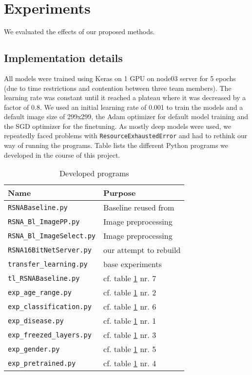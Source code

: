 \documentclass[10pt,twocolumn,letterpaper]{article}
\begin{document}
\section{Experiments}
We evaluated the effects of our proposed methods.

\subsection{Implementation details}
All models were trained using Keras \cite{keras} on 1
GPU on node03 server for 5 epochs (due to time restrictions and contention between three team members). The learning rate was constant until it reached a plateau where it was decreased by a factor of 0.8. We used an initial learning rate of 0.001 to train the models and a default image size of 299x299, the Adam optimizer for default model training and the SGD optimizer for the finetuning. As mostly deep models were used, we repeatedly faced problems with \verb+ResourceExhaustedError+ and had to rethink our way of running the programs. Table lists the different Python programs we developed in the course of this project.

\begin{table}[h]
\begin{center}
\begin{tabular}{|l|l|}
\hline
Name & Purpose \\
\hline\hline
\verb+RSNABaseline.py+ & Baseline reused from \cite{kaggleboneage}  \\
\verb+RSNA_Bl_ImagePP.py+ & Image preprocessing \\
\verb+RSNA_Bl_ImageSelect.py+ & Image preprocessing \\
\verb+RSNA16BitNetServer.py+ & our attempt to rebuild \cite{16bitrsnachallenge} \\
\verb+transfer_learning.py+ & base experiments \\
\verb+tl_RSNABaseline.py+ & cf. table \ref{table:taexp} nr. 7  \\
\verb+exp_age_range.py+ & cf. table \ref{table:taexp} nr. 2 \\
\verb+exp_classification.py+ & cf. table \ref{table:taexp} nr. 6 \\
\verb+exp_disease.py+ & cf. table \ref{table:taexp} nr. 1 \\
\verb+exp_freezed_layers.py+ & cf. table \ref{table:taexp} nr. 3 \\
\verb+exp_gender.py+ & cf. table \ref{table:taexp} nr. 5 \\
\verb+exp_pretrained.py+ & cf. table \ref{table:taexp} nr. 4 \\
\hline
\end{tabular}
\end{center}
\caption{Developed programs}
\label{table:taexp}
\end{table}
\end{document}
